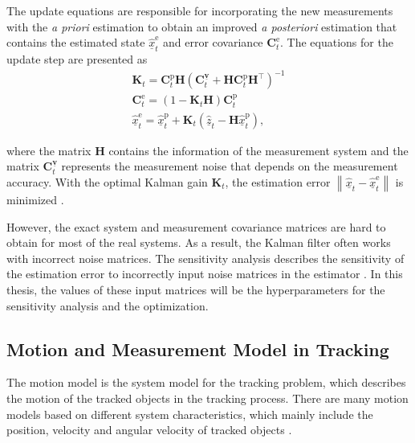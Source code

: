 The update equations are responsible for incorporating the new measurements with the \textit{a priori} estimation to obtain an improved \textit{a posteriori} estimation that contains the estimated state $\hat{\underline{x}}^{\mathrm{e}}_{t}$ and error covariance $\mathbf{C}_{t}^{\mathrm{e}}$. The equations for the update step are presented as
\begin{gather}
    \textbf{K}_{t}=\textbf{C}_{t}^{\mathrm{p}}\mathbf{H}({\textbf{C}_{t}^{\underline{\boldsymbol{v}}}}+\mathbf{H}\textbf{C}_{t}^{\mathrm{p}}\mathbf{H}^\top)^{-1}\\
    \textbf{C}_{t}^{\mathrm{e}}=(1-\textbf{K}_{t}\mathbf{H})\textbf{C}_{t}^{\mathrm{p}}\\
    \hat{\underline{x}}^{\mathrm{e}}_{t}=\hat{\underline{x}}^{\mathrm{p}}_{t}+\textbf{K}_{t}(\hat{\underline{z}}_{t}-\mathbf{H}\hat{\underline{x}}^{\mathrm{p}}_{t}), 
\end{gather}

where the matrix $\mathbf{H}$ contains the information of the measurement system and the matrix $\mathbf{C}_{t}^{\underline{\boldsymbol{v}}}$ represents the measurement noise that depends on the measurement accuracy. With the optimal Kalman gain $\textbf{K}_{t}$, the estimation error $\left \| \hat{\underline{x}}_{t}-\hat{\underline{x}}^{\mathrm{e}}_{t} \right \|$ is minimized \cite{welch1995introduction}.

However, the exact system and measurement covariance matrices are hard to obtain for most of the real systems. As a result, the Kalman filter often works with incorrect noise matrices. The sensitivity analysis describes the sensitivity of the estimation error to incorrectly input noise matrices in the estimator \cite{lu2014false}. In this thesis, the values of these input matrices will be the hyperparameters for the sensitivity analysis and the optimization.



\subsection{Motion and Measurement Model in Tracking}
\label{cv basic}
The motion model is the system model for the tracking problem, which describes the motion of the tracked objects in the tracking process. There are many motion models based on different system characteristics, which mainly include the position, velocity and angular velocity of tracked objects \cite{li2003survey}\cite{schubert2008comparison}. 

